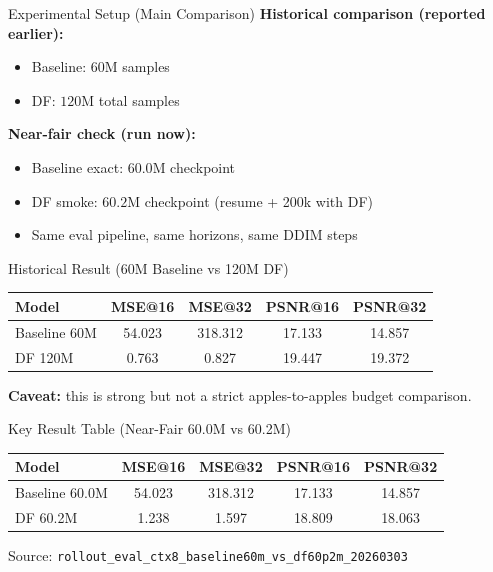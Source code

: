 \documentclass[aspectratio=169,11pt]{beamer}
\begin{document}
\begin{frame}{Experimental Setup (Main Comparison)}
\textbf{Historical comparison (reported earlier):}
\begin{itemize}
  \item Baseline: \(60\)M samples
  \item DF: \(120\)M total samples
\end{itemize}
\vspace{0.4em}
\textbf{Near-fair check (run now):}
\begin{itemize}
  \item Baseline exact: \(60.0\)M checkpoint
  \item DF smoke: \(60.2\)M checkpoint (resume + 200k with DF)
  \item Same eval pipeline, same horizons, same DDIM steps
\end{itemize}
\end{frame}

\begin{frame}{Historical Result (60M Baseline vs 120M DF)}
\begin{table}
\centering
\begin{tabular}{lcccc}
\toprule
Model & MSE@16 & MSE@32 & PSNR@16 & PSNR@32 \\
\midrule
Baseline 60M & 54.023 & 318.312 & 17.133 & 14.857 \\
DF 120M & 0.763 & 0.827 & 19.447 & 19.372 \\
\bottomrule
\end{tabular}
\end{table}
\vspace{0.3em}
\textbf{Caveat:} this is strong but not a strict apples-to-apples budget comparison.
\end{frame}

\begin{frame}{Key Result Table (Near-Fair 60.0M vs 60.2M)}
\begin{table}
\centering
\begin{tabular}{lcccc}
\toprule
Model & MSE@16 & MSE@32 & PSNR@16 & PSNR@32 \\
\midrule
Baseline 60.0M & 54.023 & 318.312 & 17.133 & 14.857 \\
DF 60.2M & 1.238 & 1.597 & 18.809 & 18.063 \\
\bottomrule
\end{tabular}
\end{table}
\vspace{0.4em}
\footnotesize
Source: \texttt{rollout\_eval\_ctx8\_baseline60m\_vs\_df60p2m\_20260303}
\end{frame}
\end{document}
